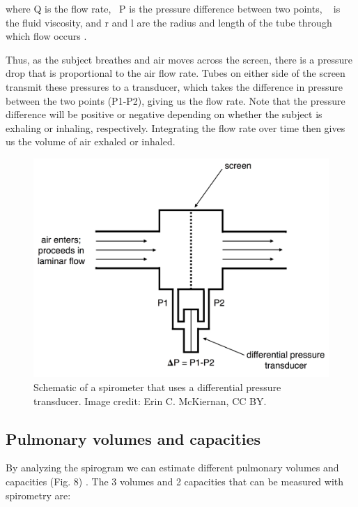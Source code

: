 \documentclass{article}
\begin{document}
where Q is the flow rate,  P is the pressure difference between two points,   is the fluid viscosity, and r and l are the radius and length of the tube through which flow occurs \citep{Schlegelmilch2011Pulmonary}.

Thus, as the subject breathes and air moves across the screen, there is a pressure drop that is proportional to the air flow rate. Tubes on either side of the screen transmit these pressures to a transducer, which takes the difference in pressure between the two points (P1-P2), giving us the flow rate. Note that the pressure difference will be positive or negative depending on whether the subject is exhaling or inhaling, respectively. Integrating the flow rate over time then gives us the volume of air exhaled or inhaled.

\begin{figure}[!htbp]
\centering
\includegraphics[width=0.7\linewidth]{files/EPpXta8zJdzN048lz8AR-b45806726ab4eac254cca6d23b1fa177.png}
\caption[]{Schematic of a spirometer that uses a differential pressure transducer. Image credit: Erin C. McKiernan, CC BY.}
\label{aw0tRetz12}
\end{figure}

\subsection{Pulmonary volumes and capacities}

By analyzing the spirogram we can estimate different pulmonary volumes and capacities (Fig. 8) \citep{guyton2016book, openStax_breathing}. The 3 volumes and 2 capacities that can be measured with spirometry are:
\end{document}
